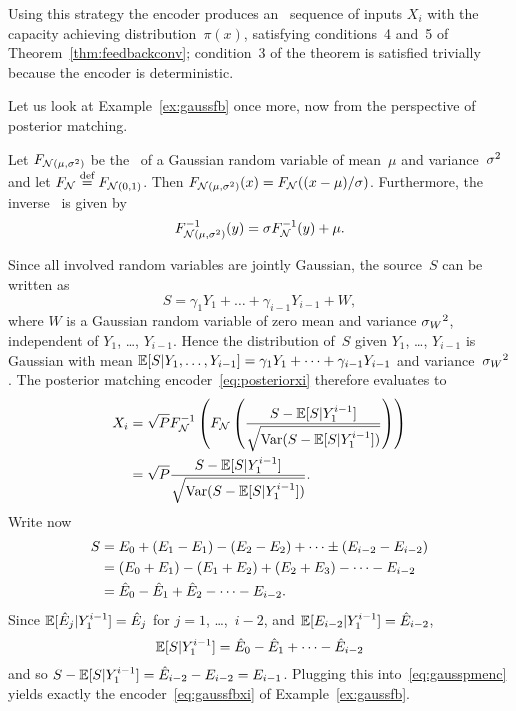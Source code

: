 Using this strategy the encoder produces an \iid\ sequence of inputs $X_i$
with the capacity achieving distribution~$\pi(x)$, satisfying conditions~4 and~5
of Theorem~\ref{thm:feedbackconv}; condition~3 of the theorem is satisfied
trivially because the encoder is deterministic.

Let us look at Example~\ref{ex:gaussfb} once more, now from the perspective of
posterior matching.

\begin{example}
  \label{ex:gaussfbpost}
  Let $F_{{\mathcal{N}}(\mu, {\sigma^2})}$ be the \cdf\ of a Gaussian random variable of
  mean~$\mu$ and variance~${\sigma^2}$ and let $F_{\mathcal{N}} \stackrel{\text{def}}{=} F_{{\mathcal{N}}(0,1)}$. Then
  $F_{{\mathcal{N}}(\mu,{\sigma^2})}(x) = F_{\mathcal{N}}((x-\mu)/\sigma)$. Furthermore, the inverse \cdf\ is
  given by
  \begin{equation*}
    F_{{\mathcal{N}}(\mu,{\sigma^2})}^{-1}(y) = \sigma F_{\mathcal{N}}^{-1}(y) + \mu.
  \end{equation*}

  Since all involved random variables are jointly Gaussian, the source~$S$ can
  be written as
  \begin{equation*}
    S = \gamma_1 Y_1 + \dots + \gamma_{i-1} Y_{i-1} + W,
  \end{equation*}
  where $W$ is a Gaussian random variable of zero mean and variance ${{\sigma_W}^2}$,
  independent of $Y_1$, \ldots, $Y_{i-1}$. Hence the distribution of~$S$ given
  $Y_1$, \ldots, $Y_{i-1}$ is Gaussian with mean $\mathbb{E}[S|Y_1, \dots, Y_{i-1}] =
  \gamma_1 Y_1 + \dots + \gamma_{i-1} Y_{i-1}$ and variance~${{\sigma_W}^2}$.  The
  posterior matching encoder~\eqref{eq:posteriorxi} therefore evaluates to
  \begin{align}
    X_i &= \sqrt{P} F_{\mathcal{N}}^{-1}\left( F_{\mathcal{N}}\left( \frac{S - \mathbb{E}[S|Y_1^{i-1}]}
    {\sqrt{\operatorname{Var}(S - \mathbb{E}[S|Y_1^{i-1}])}} \right) \right) \nonumber \\
    \label{eq:gausspmenc}
    &= \sqrt{P} \frac{S - \mathbb{E}[S|Y_1^{i-1}]}
    {\sqrt{\operatorname{Var}(S - \mathbb{E}[S|Y_1^{i-1}])}} .
  \end{align}
  Write now
  \begin{align*}
    S &= E_0 + (E_1 - E_1) - (E_2 - E_2) + \dots \pm (E_{i-2} -
    E_{i-2}) \\
    &= (E_0 + E_1) - (E_1 + E_2) + (E_2 + E_3) - \dots - E_{i-2} \\
    &= \hat{E}_0 - \hat{E}_1 + \hat{E}_2 - \dots - E_{i-2}.
  \end{align*}
  Since $\mathbb{E}[\hat{E}_j | Y_1^{i-1}] = \hat{E}_j$ for $j = 1$, \dots,~$i-2$, and
  $\mathbb{E}[E_{i-2}|Y_1^{i-1}] = \hat{E}_{i-2}$, 
  \begin{equation*}
    \mathbb{E}[S|Y_1^{i-1}] = \hat{E}_0 - \hat{E}_1 + \dots  - \hat{E}_{i-2}
  \end{equation*}
  and so $S - \mathbb{E}[S|Y_1^{i-1}] = \hat{E}_{i-2} - E_{i-2} = E_{i-1}$. Plugging this
  into~\eqref{eq:gausspmenc} yields exactly the encoder~\eqref{eq:gaussfbxi} of
  Example~\ref{ex:gaussfb}.
\end{example}


